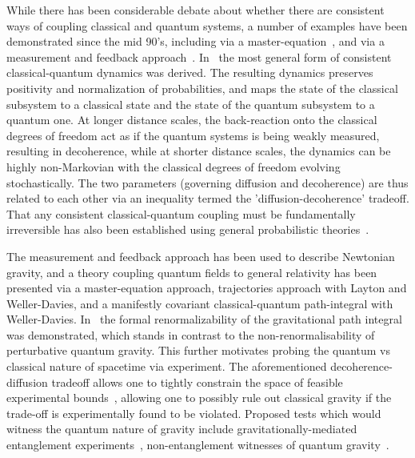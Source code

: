 \documentclass[aps,preprintnumbers,superscriptaddress,longbibliography]{revtex4-1}
\begin{document}
While there has been considerable debate about whether there are consistent ways of coupling classical and quantum systems, a number of examples have been demonstrated since the mid 90's, including via a master-equation~\cite{blanchard1993interaction,diosi1995quantum}, and via a measurement and feedback approach~\cite{diosi1998coupling,kafri2014classical,tilloy2016sourcing}. In~\cite{oppenheim2023postquantum,oppenheim2022two} the most general form of consistent classical-quantum dynamics was derived.  The resulting dynamics preserves positivity and normalization of probabilities, and maps the state of the classical subsystem to a classical state and the state of the quantum subsystem to a quantum one. At longer distance scales, the back-reaction onto the classical degrees of freedom act as if the quantum systems is being weakly measured, resulting in decoherence, while at shorter distance scales, the dynamics can be highly non-Markovian with the classical degrees of freedom evolving stochastically. The two parameters (governing diffusion and decoherence) are thus related to each other via an inequality termed the 'diffusion-decoherence' tradeoff\cite{diosi1995quantum,oppenheim2023gravitationally}. That any consistent classical-quantum coupling must be fundamentally irreversible has also been established using general probabilistic theories~\cite{galley2023any}. 

The measurement and feedback approach has been used to describe Newtonian gravity\cite{kafri2014classical,tilloy2016sourcing,tilloy2017principle}, and a theory coupling quantum fields to general relativity has been presented via a master-equation approach\cite{oppenheim2023postquantum}, trajectories approach\cite{layton2024healthier} with Layton and Weller-Davies, and a manifestly covariant classical-quantum path-integral with Weller-Davies\cite{oppenheim2023covariant}. In~\cite{grudka2024renormalisation} the formal renormalizability of the gravitational path integral was demonstrated, which stands in contrast to the non-renormalisability of perturbative quantum gravity. This further motivates probing the quantum vs classical nature of spacetime via experiment.
The aforementioned decoherence-diffusion tradeoff allows one to tightly constrain the space of feasible experimental bounds~\cite{oppenheim2022decoherence,janse2024current}, allowing one to possibly rule out classical gravity if the trade-off is experimentally found to be violated. Proposed tests which would witness the quantum nature of gravity include gravitationally-mediated entanglement experiments~\cite{bose2017spin,marletto2017gravitationally,carney2019tabletop}, non-entanglement witnesses of quantum gravity~\cite{lami2024testing,kryhin2025distinguishable}.
\end{document}
